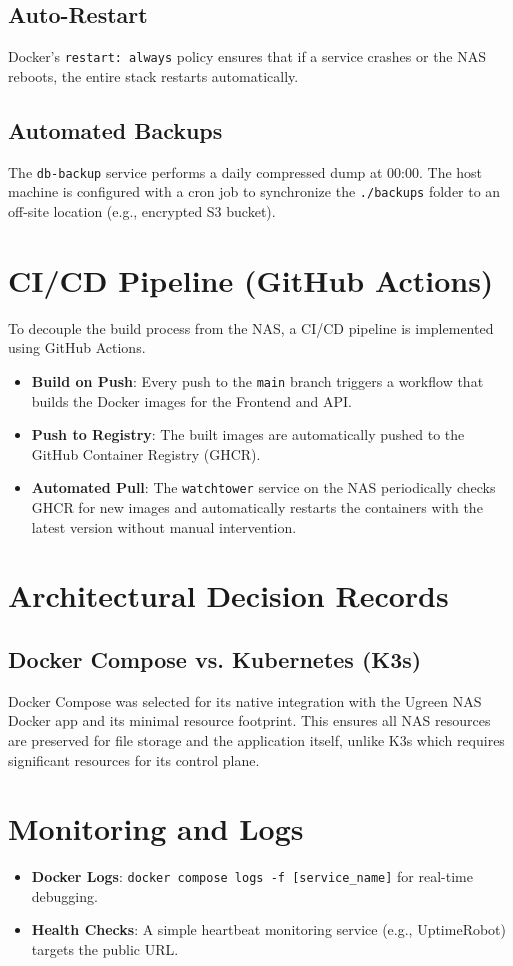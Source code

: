 \subsection{Auto-Restart}
Docker's \texttt{restart: always} policy ensures that if a service crashes or the NAS reboots, the entire stack restarts automatically.

\subsection{Automated Backups}
The \texttt{db-backup} service performs a daily compressed dump at 00:00. The host machine is configured with a cron job to synchronize the \texttt{./backups} folder to an off-site location (e.g., encrypted S3 bucket).

\section{CI/CD Pipeline (GitHub Actions)}
To decouple the build process from the NAS, a CI/CD pipeline is implemented using GitHub Actions.
\begin{itemize}
    \item \textbf{Build on Push}: Every push to the \texttt{main} branch triggers a workflow that builds the Docker images for the Frontend and API.
    \item \textbf{Push to Registry}: The built images are automatically pushed to the GitHub Container Registry (GHCR).
    \item \textbf{Automated Pull}: The \texttt{watchtower} service on the NAS periodically checks GHCR for new images and automatically restarts the containers with the latest version without manual intervention.
\end{itemize}

\section{Architectural Decision Records}
\subsection{Docker Compose vs. Kubernetes (K3s)}
Docker Compose was selected for its native integration with the Ugreen NAS Docker app and its minimal resource footprint. This ensures all NAS resources are preserved for file storage and the application itself, unlike K3s which requires significant resources for its control plane.

\section{Monitoring and Logs}
\begin{itemize}
    \item \textbf{Docker Logs}: \texttt{docker compose logs -f [service\_name]} for real-time debugging.
    \item \textbf{Health Checks}: A simple heartbeat monitoring service (e.g., UptimeRobot) targets the public URL.
\end{itemize}
